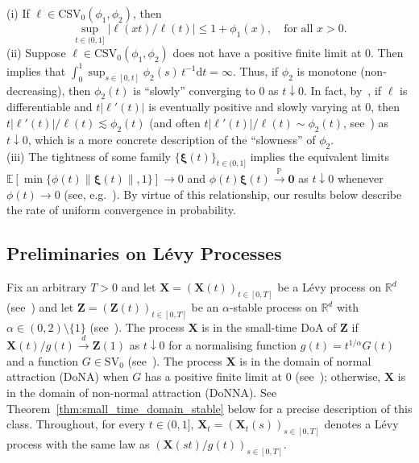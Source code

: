 \documentclass[en,oneside,bbfont,article]{amsart}
\theoremstyle{remark}
\newenvironment{remark}
    {\pushQED{\qed}\renewcommand{\qedsymbol}{$\Diamond$}\remarkx}
    {\popQED\endremarkx}
\theoremstyle{definition}
\theoremstyle{definition}
\newcommand\X{\bm{\mathcal{X}}}
\newcommand\ZZ{\bm{\mathcal{Z}}}
\newcommand\R{\mathbb{R}}
\newcommand\E{\mathds{E}}
\newcommand\p{\mathds{P}}
\newcommand\1{\mathds{1}}
\newcommand\Oh{\mathcal{O}}
\newcommand\SV{\mathrm{SV}}
\newcommand\CSV{\mathrm{CSV}}
\newcommand\da{\downarrow}
\renewcommand\le{\leqslant}
\newcommand\cid{\xrightarrow{d}}
\newcommand\cip{\xrightarrow{\p}}
\newcommand{\D}{\mathrm{d}}
\newcommand\jorge[1]{{\color{red}#1}}
\begin{document}
\begin{remark}
\label{rem:CSV}
(i) If $\ell\in\CSV_0(\phi_1,\phi_2)$, then 
\[
\sup_{t\in(0,1]}|\ell(xt)/\ell(t)|
\le 1+\phi_1(x),
\quad \text{for all }x>0.
\]
(ii) Suppose $\ell\in\CSV_0(\phi_1,\phi_2)$ does not have a positive finite limit at $0$. Then~\cite[Lem.~7.2(a)]{WassersteinPaper} implies that $\int_0^1 \sup_{s\in[0,t]}\phi_2(s)\, t^{-1}\D t=\infty$. Thus, if $\phi_2$ is monotone (non-decreasing), then $\phi_2(t)$ is ``slowly'' converging to $0$ as $t\da 0$. In fact, by~\cite[Lem.~7.1]{WassersteinPaper}, if $\ell$ is differentiable and $t|\ell'(t)|$ is eventually positive and slowly varying at $0$, then $t|\ell'(t)|/\ell(t)\lesssim \phi_2(t)$ (and often $t|\ell'(t)|/\ell(t)\sim \phi_2(t)$, see~\cite[Lem.~6.1--6.3]{WassersteinPaper}) as $t\da 0$, which is a more concrete description of the ``slowness'' of $\phi_2$.\\
(iii) The tightness of some family $\{\bm{\xi}(t)\}_{t\in(0,1]}$ implies the equivalent limits %
$\E[\min\{\phi(t)\|\bm{\xi}(t)\|,1\}]\to 0$ and $\phi(t)\bm{\xi}(t)\cip \bm{0}$ as $t\da 0$ whenever $\phi(t)\to 0$ (see, e.g.~\cite[Lem.~5.2~\&~5.9]{MR4226142}). By virtue of this relationship, our results below describe the rate of uniform convergence in probability.
\end{remark}

\subsection{Preliminaries on L\'evy Processes}\label{sec:prelimi_SDEs_stable}
Fix an arbitrary $T>0$ and let $\bm{X}=(\bm{X}(t))_{t \in [0,T]}$ be a L\'evy process on $\R^d$ (see~\cite[Def.~1.6, Ch.~1]{MR3185174}) and let $\bm{Z}=(\bm{Z}(t))_{t\in [0,T]}$ be an $\alpha$-stable process on $\R^d$ with $\alpha\in (0,2)\setminus\{1\}$ (see~\cite[Sec.~1.2]{MR3808900}). The process $\bm{X}$ is in the small-time DoA of $\bm{Z}$ if $\bm{X}(t)/g(t)\cid \bm{Z}(1)$ as $t \da 0$ for a normalising function $g(t)=t^{1/\alpha}G(t)$ and a function $G\in \SV_0$ (see~\cite[Eq.~(8)]{MR3784492}). The process $\bm{X}$ is in the domain of normal attraction (DoNA) when $G$ has a positive finite limit at $0$ (see~\cite[p.~181]{MR0233400}); otherwise, $\bm{X}$ is in the domain of non-normal attraction (DoNNA). See Theorem~\ref{thm:small_time_domain_stable} below for a precise description of this class. Throughout, for every $t\in (0,1]$, $\bm{X}_t=(\bm{X}_t(s))_{s\in[0,T]}$ denotes a L\'evy process with the same law as $(\bm{X}(st)/g(t))_{s\in[0,T]}$. 
\end{document}
